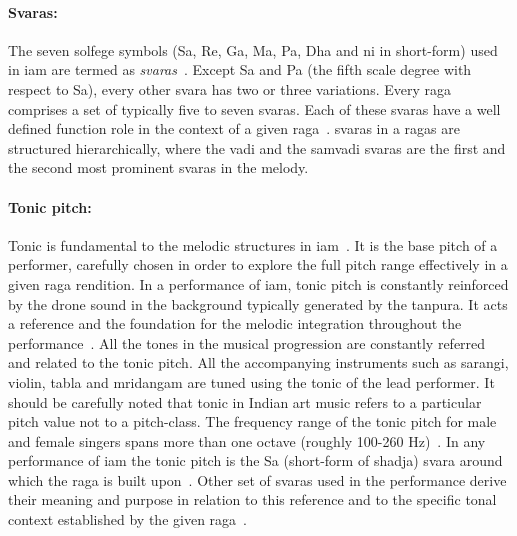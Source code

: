\paragraph{Svaras:} The seven solfege symbols (Sa, Re, Ga, Ma, Pa, Dha and \gls{ni} in short-form) used in \gls{iam} are termed as \textit{svaras}~\cite{Danielou2010,Bagchee1998}. Except Sa and Pa (the fifth scale degree with respect to Sa), every other \gls{svara} has two or three variations. Every \gls{raga} comprises a set of typically five to seven \glspl{svara}. Each of these \glspl{svara} have a well defined function role in the context of a given \gls{raga}~\cite{Viswanathan2004}. \Glspl{svara} in a \glspl{raga} are structured hierarchically, where the \gls{vadi} and the \gls{samvadi} \glspl{svara} are the first and the second most prominent \glspl{svara} in the melody.


\paragraph{Tonic pitch:} Tonic is fundamental to the melodic structures in \gls{iam}~\cite{Viswanathan2004,Danielou2010}. It is the base pitch of a performer, carefully chosen in order to explore the full pitch range effectively in a given \gls{raga} rendition. In a performance of \gls{iam}, tonic pitch is constantly reinforced by the drone sound in the background typically generated by the \gls{tanpura}. It acts a reference and the foundation for the melodic integration throughout the performance~\cite{Deva1980}. All the tones in the musical progression are constantly referred and related to the tonic pitch. All the accompanying instruments such as \gls{sarangi}, violin, \gls{tabla} and \gls{mridangam} are tuned using the tonic of the lead performer. It should be carefully noted that tonic in Indian art music refers to a particular pitch value not to a pitch-class. The frequency range of the tonic pitch for male and female singers spans more than one octave (roughly 100-260 Hz)~\cite{Sengupta2005b}. In any performance of \gls{iam} the tonic pitch is the Sa (short-form of \gls{shadja}) \gls{svara} around which the \gls{raga} is built upon~\cite{Danielou2010,Bagchee1998}. Other set of \glspl{svara} used in the performance derive their meaning and purpose in relation to this reference and to the specific tonal context established by the given \gls{raga}~\cite{Deva1980}. 

